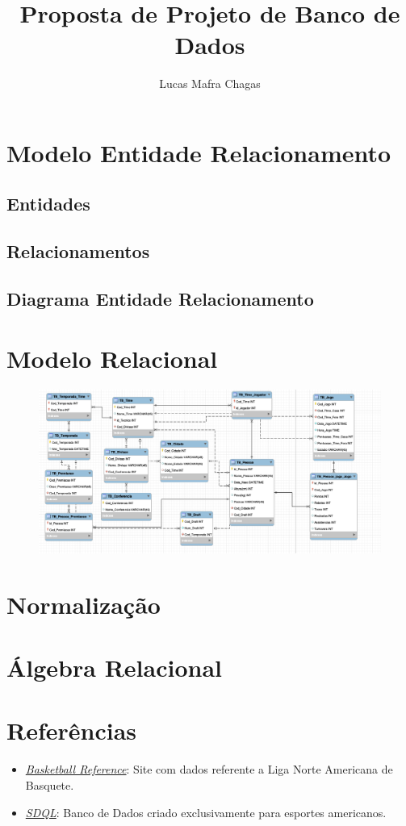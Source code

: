 \documentclass[12pt]{article}
\title{Proposta de Projeto de Banco de Dados}
\author{Lucas Mafra Chagas}
\begin{document}
	\maketitle
	
	\tableofcontents
	\newpage
	
	\section{Modelo Entidade Relacionamento}
	\subsection{Entidades}
	\subsection{Relacionamentos}
	\subsection{Diagrama Entidade Relacionamento}
	\newpage
	\section{Modelo Relacional}
		\begin{figure}[H]
			\includegraphics[width=1.0\textwidth]{mrnba.png}
		\end{figure}
	\newpage
	\section{Normalização}
	\newpage
	\section{Álgebra Relacional}
	\newpage
	\section{Referências}
	\begin{itemize}
		\item\textit{\href{http://www.basketball-reference.com/}{Basketball Reference}}: Site com dados referente a Liga Norte Americana de Basquete.
		\item\textit{\href{http://killersports.com/nba/home}{SDQL}}: Banco de Dados criado exclusivamente para esportes americanos.
	\end{itemize}
	\newpage
	
	
\end{document}
